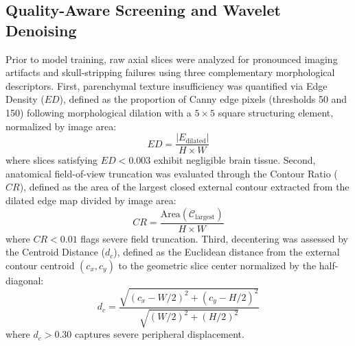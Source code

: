 \documentclass[11pt,a4paper]{article}
\begin{document}
\subsection{Quality-Aware Screening and Wavelet Denoising}
Prior to model training, raw axial slices were analyzed for pronounced imaging artifacts and skull-stripping failures using three complementary morphological descriptors. First, parenchymal texture insufficiency was quantified via Edge Density ($ED$), defined as the proportion of Canny edge pixels (thresholds 50 and 150) following morphological dilation with a $5 \times 5$ square structuring element, normalized by image area:
\begin{equation}
ED = \frac{|E_{\text{dilated}}|}{H \times W}
\end{equation}
where slices satisfying $ED < 0.003$ exhibit negligible brain tissue. Second, anatomical field-of-view truncation was evaluated through the Contour Ratio ($CR$), defined as the area of the largest closed external contour extracted from the dilated edge map divided by image area:
\begin{equation}
CR = \frac{\text{Area}(\mathcal{C}_{\text{largest}})}{H \times W}
\end{equation}
where $CR < 0.01$ flags severe field truncation. Third, decentering was assessed by the Centroid Distance ($d_c$), defined as the Euclidean distance from the external contour centroid $(c_x, c_y)$ to the geometric slice center normalized by the half-diagonal:
\begin{equation}
d_c = \frac{\sqrt{(c_x - W/2)^2 + (c_y - H/2)^2}}{\sqrt{(W/2)^2 + (H/2)^2}}
\end{equation}
where $d_c > 0.30$ captures severe peripheral displacement.
\end{document}
